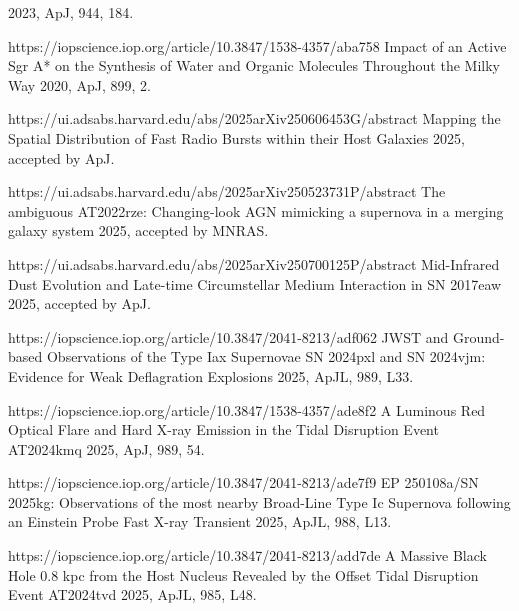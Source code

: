\begin{cvpubs}
{\begin{cvitems}
    {2023, ApJ, 944, 184.}
    \item {}
    {}
    {https://iopscience.iop.org/article/10.3847/1538-4357/aba758}
    {Impact of an Active Sgr A* on the Synthesis of Water and Organic Molecules Throughout the Milky Way}
    {2020, ApJ, 899, 2.}
    \item {}
    {\Cliu}
    {https://ui.adsabs.harvard.edu/abs/2025arXiv250606453G/abstract}
    {Mapping the Spatial Distribution of Fast Radio Bursts within their Host Galaxies}
    {2025, accepted by ApJ.}
    \item {}
    {\Cliu}
    {https://ui.adsabs.harvard.edu/abs/2025arXiv250523731P/abstract}
    {The ambiguous AT2022rze: Changing-look AGN mimicking a supernova in a merging galaxy system}
    {2025, accepted by MNRAS.}
    \item {}
    {\Cliu}
    {https://ui.adsabs.harvard.edu/abs/2025arXiv250700125P/abstract}
    {Mid-Infrared Dust Evolution and Late-time Circumstellar Medium Interaction in SN 2017eaw}
    {2025, accepted by ApJ.}
\end{cvitems}
}
\cvpub
{
\begin{cvitems}
    \item {}
    {\Cliu}
    {https://iopscience.iop.org/article/10.3847/2041-8213/adf062}
    {JWST and Ground-based Observations of the Type Iax Supernovae SN 2024pxl and SN 2024vjm: Evidence for Weak Deflagration Explosions}
    {2025, ApJL, 989, L33.}
    \item {}
    {\Cliu}
    {https://iopscience.iop.org/article/10.3847/1538-4357/ade8f2}
    {A Luminous Red Optical Flare and Hard X-ray Emission in the Tidal Disruption Event AT2024kmq}
    {2025, ApJ, 989, 54.}
    \item {}
    {\Cliu}
    {https://iopscience.iop.org/article/10.3847/2041-8213/ade7f9}
    {EP 250108a/SN 2025kg: Observations of the most nearby Broad-Line Type Ic Supernova following an Einstein Probe Fast X-ray Transient}
    {2025, ApJL, 988, L13.}
    \item {}
    {\Cliu}
    {https://iopscience.iop.org/article/10.3847/2041-8213/add7de}
    {A Massive Black Hole 0.8 kpc from the Host Nucleus Revealed by the Offset Tidal Disruption Event AT2024tvd}
    {2025, ApJL, 985, L48.}
    \item {} 

\end{cvitems}}
\end{cvpubs}
